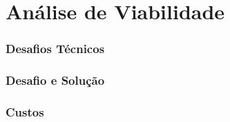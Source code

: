 \chapter{Análise de Viabilidade}
	
	\subsection{Desafios Técnicos}
	
	\subsection{Desafio e Solução}
	
	\subsection{Custos}
	
	

